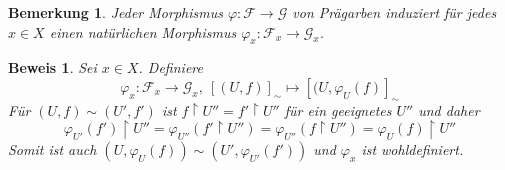 \documentclass[a4paper,oneside]{scrbook}
\theoremstyle{break}
\newtheorem{Bem}[Def]{Bemerkung}
\theoremstyle{nonumberbreak}
\theoremstyle{nonumberplain}
\newtheorem{Bew}{Beweis}
\theoremstyle{break}
\renewcommand{\phi}{%
	\ensuremath{\varphi}%
}
\begin{document}
\begin{Bem}
	\label{rem:sheaf_morphism:induces_stalk_morphism}
	Jeder Morphismus $\phi\colon \mathcal{F} \to \mathcal{G}$ von Prägarben induziert für jedes $x\in X$ einen natürlichen Morphismus $\phi_x\colon \mathcal{F}_x \to \mathcal{G}_x$. 
\end{Bem}
\begin{Bew}
	Sei $x\in X$. Definiere
	\[ \phi_x\colon \mathcal{F}_x \to \mathcal{G}_x,\ [ (U,f) ]_{\sim} \mapsto [ (U,\phi_{U}(f) ]_{\sim} \]
	Für $(U,f) \sim (U',f')$ ist $f\restriction U'' = f'\restriction U''$ für ein geeignetes $U''$ und daher
	\[ \phi_{U'}( f' ) \restriction U'' = \phi_{U''}( f' \restriction U'' ) = \phi_{U''}( f \restriction U'' ) = \phi_{U}( f ) \restriction U'' \]
	Somit ist auch $(U , \phi_{U}(f)) \sim (U', \phi_{U'}(f'))$ und $\phi_x$ ist wohldefiniert.
\end{Bew}
\end{document}
